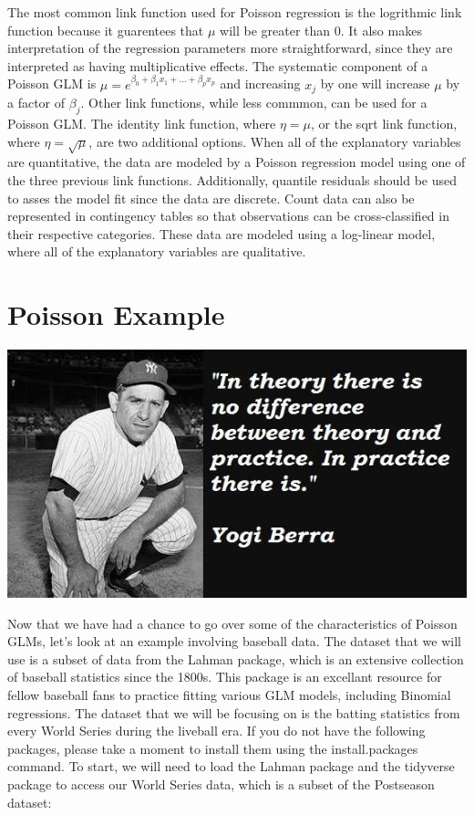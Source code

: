 \documentclass[
]{book}
\begin{document}
The most common link function used for Poisson regression is the logrithmic link function because it guarentees that \(\mu\) will be greater than 0. It also makes interpretation of the regression parameters more straightforward, since they are interpreted as having multiplicative effects. The systematic component of a Poisson GLM is \(\mu = e^{\beta_0 + \beta_1x_1 + ... + \beta_px_p}\) and increasing \(x_j\) by one will increase \(\mu\) by a factor of \(\beta_j\). Other link functions, while less commmon, can be used for a Poisson GLM. The identity link function, where \(\eta = \mu\), or the sqrt link function, where \(\eta = \sqrt{\mu}\), are two additional options. When all of the explanatory variables are quantitative, the data are modeled by a Poisson regression model using one of the three previous link functions. Additionally, quantile residuals should be used to asses the model fit since the data are discrete. Count data can also be represented in contingency tables so that observations can be cross-classified in their respective categories. These data are modeled using a log-linear model, where all of the explanatory variables are qualitative.

\hypertarget{poisson-example}{%
\section{Poisson Example}\label{poisson-example}}

\includegraphics{images/bsb.jpg}

Now that we have had a chance to go over some of the characteristics of Poisson GLMs, let's look at an example involving baseball data. The dataset that we will use is a subset of data from the Lahman package, which is an extensive collection of baseball statistics since the 1800s. This package is an excellant resource for fellow baseball fans to practice fitting various GLM models, including Binomial regressions. The dataset that we will be focusing on is the batting statistics from every World Series during the liveball era. If you do not have the following packages, please take a moment to install them using the install.packages command. To start, we will need to load the Lahman package and the tidyverse package to access our World Series data, which is a subset of the Postseason dataset:
\end{document}
